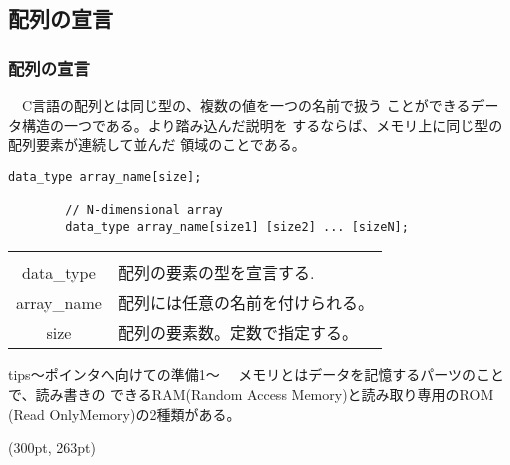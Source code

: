 \documentclass[dvipdfmx]{beamer}
\begin{document}
\subsection{配列の宣言}
\begin{frame}[t, fragile, label=57]
    \frametitle{配列の宣言}
    　C言語の配列とは同じ型の、複数の値を一つの名前で扱う
    ことができるデータ構造の一つである。より踏み込んだ説明を
    するならば、メモリ上に同じ型の配列要素が連続して並んだ
    領域のことである。
    \vspace{-5pt}
    \begin{lstlisting}[gobble=8, caption=Syntax of array declaration]
        data_type array_name[size];

        // N-dimensional array
        data_type array_name[size1] [size2] ... [sizeN]; 
    \end{lstlisting}
    \vspace{-8pt}
    \begin{table}
    \centering
        \begin{tabular}{cl}
            \hline \vspace{-10pt}\\
            data\_type & 配列の要素の型を宣言する.\\
            array\_name & 配列には任意の名前を付けられる。\\
            size & 配列の要素数。定数で指定する。\\
            \hline
        \end{tabular}
    \end{table}
    \vspace{-3pt}
    \begin{itembox}[l]{tips\space～ポインタへ向けての準備1～}
        \vspace{-5pt}
            　メモリとはデータを記憶するパーツのことで、読み書きの
            できるRAM(Random Access Memory)と読み取り専用のROM
            (Read OnlyMemory)の2種類がある。
    \end{itembox}
    \begin{textblock*}{0.3\linewidth}(300pt, 263pt)
        \hyperlink{56}{}
        \space
        \hyperlink{58}{}
    \end{textblock*}
\end{frame}
\end{document}
